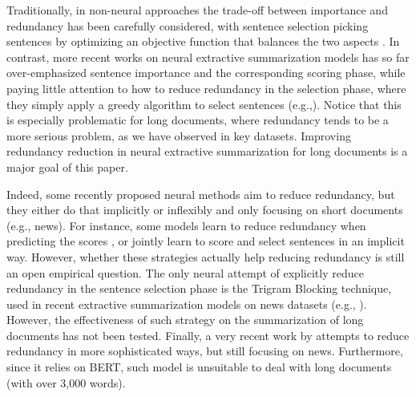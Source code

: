 \documentclass[11pt,a4paper]{article}
\begin{document}
Traditionally, in non-neural approaches the trade-off between importance and redundancy has been carefully considered, with sentence selection picking sentences by optimizing an objective function that balances the two aspects \cite{mmr,redundancy_aware}. In contrast, more recent works on neural extractive summarization models has so far over-emphasized sentence importance and the corresponding scoring phase, while paying little attention to how to reduce redundancy in the selection phase, where they simply apply a greedy algorithm to select sentences (e.g.,\citet{cheng-lapata-2016-neural, xiao-carenini-2019-extractive}). Notice that this is especially problematic for long documents, where redundancy tends to be a more serious problem, as we have observed in key datasets. Improving redundancy reduction in neural extractive summarization for long documents is a major goal of this paper.


















Indeed, some recently proposed neural methods
aim to reduce redundancy, but they either do that implicitly or inflexibly and only focusing on short documents (e.g., news). For instance, some  models learn to reduce redundancy when predicting the scores \cite{summarunner}, or jointly learn to score and select sentences \cite{NeuSum} in an implicit way. However, whether these strategies actually help reducing redundancy is still an open empirical question. The only neural attempt of explicitly reduce redundancy in the sentence selection phase is the Trigram Blocking technique, used in  recent extractive summarization models on news datasets (e.g., \cite{liu-lapata-2019-text}). However, the effectiveness of such strategy on the summarization of long documents has not been tested. Finally, a very recent work by \citet{Bi2020} attempts to reduce redundancy in more sophisticated ways, but still focusing on news. Furthermore, since it relies on BERT, such model is unsuitable to deal with long documents (with over 3,000 words).
\end{document}
